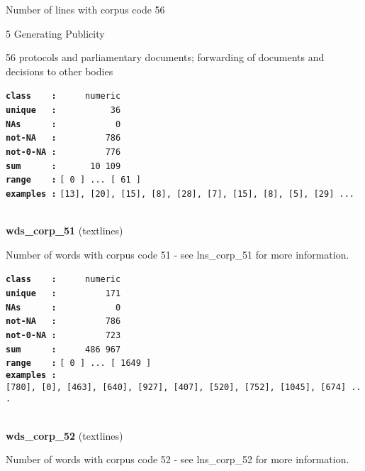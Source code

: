 \documentclass[]{article}
\begin{document}
Number of lines with corpus code 56

5 Generating Publicity

56 protocols and parliamentary documents; forwarding of documents and
decisions to other bodies

\textbf{\texttt{class\ \ \ \ :}} \texttt{~~~~~numeric}\\
\textbf{\texttt{unique\ \ \ :}} \texttt{~~~~~~~~~~36}\\
\textbf{\texttt{NAs\ \ \ \ \ \ :}} \texttt{~~~~~~~~~~~0}\\
\textbf{\texttt{not-NA\ \ \ :}} \texttt{~~~~~~~~~786}\\
\textbf{\texttt{not-0-NA\ :}} \texttt{~~~~~~~~~776}\\
\textbf{\texttt{sum\ \ \ \ \ \ :}} \texttt{~~~~~~10~109}\\
\textbf{\texttt{range\ \ \ \ :}}
\texttt{{[}\ 0\ {]}\ ...\ {[}\ 61\ {]}}\\
\textbf{\texttt{examples\ :}}
\texttt{{[}13{]},\ {[}20{]},\ {[}15{]},\ {[}8{]},\ {[}28{]},\ {[}7{]},\ {[}15{]},\ {[}8{]},\ {[}5{]},\ {[}29{]}\ ...}\\

~

\textbf{wds\_corp\_51} (textlines)

Number of words with corpus code 51 - see lns\_corp\_51 for more
information.

\textbf{\texttt{class\ \ \ \ :}} \texttt{~~~~~numeric}\\
\textbf{\texttt{unique\ \ \ :}} \texttt{~~~~~~~~~171}\\
\textbf{\texttt{NAs\ \ \ \ \ \ :}} \texttt{~~~~~~~~~~~0}\\
\textbf{\texttt{not-NA\ \ \ :}} \texttt{~~~~~~~~~786}\\
\textbf{\texttt{not-0-NA\ :}} \texttt{~~~~~~~~~723}\\
\textbf{\texttt{sum\ \ \ \ \ \ :}} \texttt{~~~~~486~967}\\
\textbf{\texttt{range\ \ \ \ :}}
\texttt{{[}\ 0\ {]}\ ...\ {[}\ 1649\ {]}}\\
\textbf{\texttt{examples\ :}}
\texttt{{[}780{]},\ {[}0{]},\ {[}463{]},\ {[}640{]},\ {[}927{]},\ {[}407{]},\ {[}520{]},\ {[}752{]},\ {[}1045{]},\ {[}674{]}\ ...}\\

~

\textbf{wds\_corp\_52} (textlines)

Number of words with corpus code 52 - see lns\_corp\_52 for more
information.
\end{document}
